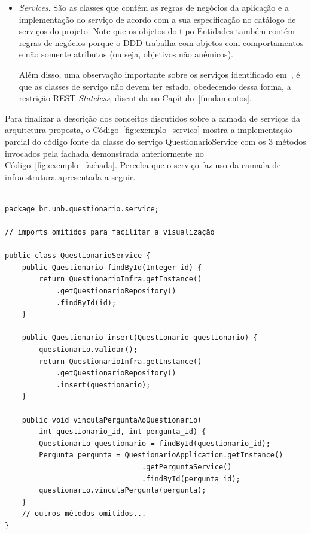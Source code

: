 \begin{itemize}
\begin{itemize}
		\item \textit{Services}. São as classes que contém 
				as regras de negócios da aplicação e
				a implementação do serviço
				de acordo com a sua especificação 
				no catálogo de serviços do projeto.
				Note que os objetos do tipo Entidades
				também contém regras de negócios
				porque o \acrshort{DDD} trabalha com objetos 
				com comportamentos 
				e não somente atributos (ou seja, objetivos não anêmicos).
				
				Além disso, uma observação importante
				sobre os serviços identificado em~\cite{fielding1999rfc},
				é que as classes de serviço não devem ter estado,
				obedecendo dessa forma, a restrição REST \textit{Stateless},
				discutida no Capítulo~\ref{fundamentos}.
	\end{itemize}
	
	Para finalizar a descrição dos conceitos discutidos 
	sobre a camada de serviços da arquitetura proposta,	
	o Código~\ref{fig:exemplo_servico} mostra a implementação 
	parcial do código fonte da classe do 
	serviço QuestionarioService com os 3 métodos invocados
	pela fachada demonstrada anteriormente 
	no Código~\ref{fig:exemplo_fachada}. Perceba que 
	o serviço faz uso da camada de infraestrutura apresentada a seguir.
	
	
             
\renewcommand{\lstlistingname}{Código}             
\begin{lstlisting}[caption=Exemplo de implementação do serviço QuestionarioService., label=fig:exemplo_servico]

package br.unb.questionario.service;

// imports omitidos para facilitar a visualização

public class QuestionarioService {
	public Questionario findById(Integer id) {
		return QuestionarioInfra.getInstance()
			.getQuestionarioRepository()
			.findById(id);
	}
	
	public Questionario insert(Questionario questionario) {
		questionario.validar();
		return QuestionarioInfra.getInstance()
			.getQuestionarioRepository()
			.insert(questionario);
	}	
	
	public void vinculaPerguntaAoQuestionario(
		int questionario_id, int pergunta_id) {
		Questionario questionario = findById(questionario_id);
		Pergunta pergunta = QuestionarioApplication.getInstance()
								.getPerguntaService()
								.findById(pergunta_id);
		questionario.vinculaPergunta(pergunta);
	}	
	// outros métodos omitidos...
}
\end{lstlisting}
	




\end{itemize}
